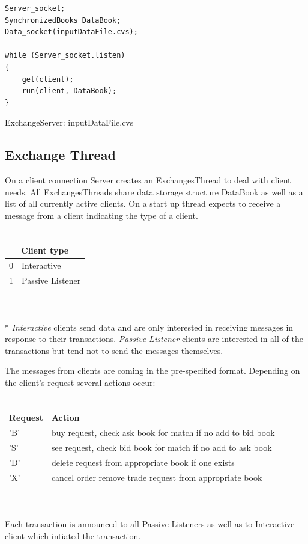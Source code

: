 \documentclass[11pt]{article}
\begin{document}
\begin{code}
  \begin{verbatim}
Server_socket;
SynchronizedBooks DataBook;
Data_socket(inputDataFile.cvs);

while (Server_socket.listen)
{
	get(client);
	run(client, DataBook);
}
  \end{verbatim}
  \caption{ExchangeServer: inputDataFile.cvs}
\end{code}



\subsection{Exchange Thread}
On a client connection Server creates an ExchangesThread to deal with client needs. All ExchangesThreads share data storage structure DataBook as well as a list of all currently active clients. On a start up thread expects to receive a message from a client indicating the type of a client.
\\
\\
\begin{tabular}{|l|l|}
  \hline
  \multicolumn{2}{|c|}{Client type} \\
  \hline
  0 & Interactive\\ \hline
  1 & Passive Listener \\
  \hline
\end{tabular}
\\
\\*
\emph{Interactive} clients send data and are only interested in receiving messages in response to their transactions. \emph{Passive Listener} clients are interested in all of the transactions but tend not to send the messages themselves.

The messages from clients are coming in the pre-specified format. Depending on the client's request several actions occur:
\\
\\
\begin{tabular}{|l|l|}
  \hline
  Request & Action \\ \hline
  'B' & buy request, check ask book for match if no add to bid book \\ \hline
  'S' & see request, check bid book for match if no add to ask book \\ \hline
  'D' & delete request from appropriate book if one exists \\ \hline
  'X' & cancel order remove trade request from appropriate book\\
  \hline
\end{tabular}
\\
\\
Each transaction is announced to all Passive Listeners as well as to Interactive client which intiated the transaction. 
\end{document}
